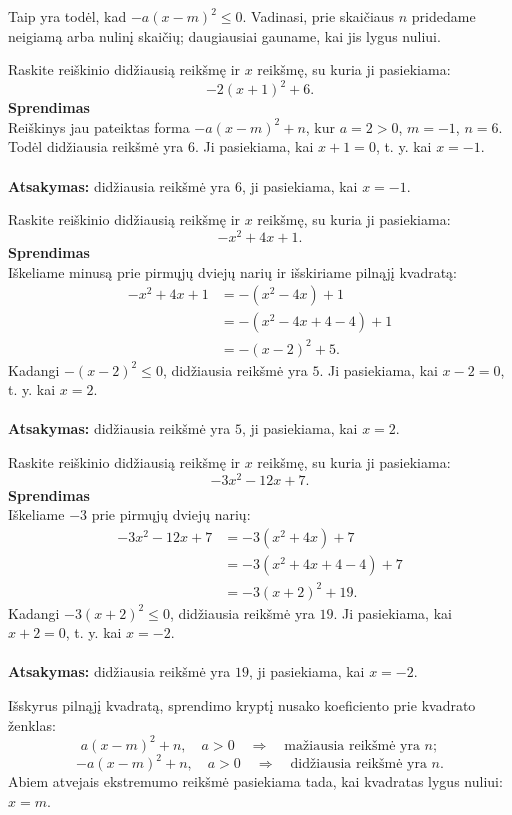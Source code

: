 \documentclass[11pt,a4paper]{scrartcl}
\begin{document}
Taip yra todėl, kad $-a(x-m)^2\leq0$. Vadinasi, prie skaičiaus $n$ pridedame neigiamą arba nulinį skaičių; daugiausiai gauname, kai jis lygus nuliui.

\begin{example}
Raskite reiškinio didžiausią reikšmę ir $x$ reikšmę, su kuria ji pasiekiama:
\[
-2(x+1)^2+6.
\]
\textbf{Sprendimas}\\
Reiškinys jau pateiktas forma $-a(x-m)^2+n$, kur $a=2>0$, $m=-1$, $n=6$. Todėl didžiausia reikšmė yra $6$. Ji pasiekiama, kai $x+1=0$, t. y. kai $x=-1$.\\ \\
\textbf{Atsakymas:} didžiausia reikšmė yra $6$, ji pasiekiama, kai $x=-1$.
\end{example}

\begin{example}
Raskite reiškinio didžiausią reikšmę ir $x$ reikšmę, su kuria ji pasiekiama:
\[
-x^2+4x+1.
\]
\textbf{Sprendimas}\\
Iškeliame minusą prie pirmųjų dviejų narių ir išskiriame pilnąjį kvadratą:
\[
\begin{aligned}
-x^2+4x+1
&=-(x^2-4x)+1\\
&=-(x^2-4x+4-4)+1\\
&=-(x-2)^2+5.
\end{aligned}
\]
Kadangi $-(x-2)^2\leq0$, didžiausia reikšmė yra $5$. Ji pasiekiama, kai $x-2=0$, t. y. kai $x=2$.\\ \\
\textbf{Atsakymas:} didžiausia reikšmė yra $5$, ji pasiekiama, kai $x=2$.
\end{example}

\begin{example}
Raskite reiškinio didžiausią reikšmę ir $x$ reikšmę, su kuria ji pasiekiama:
\[
-3x^2-12x+7.
\]
\textbf{Sprendimas}\\
Iškeliame $-3$ prie pirmųjų dviejų narių:
\[
\begin{aligned}
-3x^2-12x+7
&=-3(x^2+4x)+7\\
&=-3(x^2+4x+4-4)+7\\
&=-3(x+2)^2+19.
\end{aligned}
\]
Kadangi $-3(x+2)^2\leq0$, didžiausia reikšmė yra $19$. Ji pasiekiama, kai $x+2=0$, t. y. kai $x=-2$.\\ \\
\textbf{Atsakymas:} didžiausia reikšmė yra $19$, ji pasiekiama, kai $x=-2$.
\end{example}

\begin{remark}
Išskyrus pilnąjį kvadratą, sprendimo kryptį nusako koeficiento prie kvadrato ženklas:
\[
a(x-m)^2+n,\quad a>0 \quad \Rightarrow \quad \text{mažiausia reikšmė yra } n;
\]
\[
-a(x-m)^2+n,\quad a>0 \quad \Rightarrow \quad \text{didžiausia reikšmė yra } n.
\]
Abiem atvejais ekstremumo reikšmė pasiekiama tada, kai kvadratas lygus nuliui: $x=m$.
\end{remark}
\end{document}
